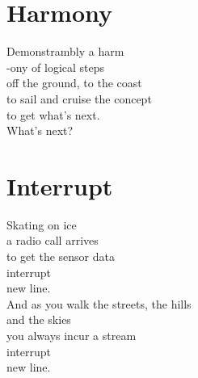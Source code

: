 \documentclass[a4paper,twoside, openany]{book}
\newenvironment{Verse}
  {\center\varwidth{\linewidth}\fontsize{18}{21.6}\selectfont}
  {\endvarwidth\endcenter}
\begin{document}
\chapter{Harmony}
\begin{Verse}
Demonstrambly a harm\\
-ony of logical steps\\
off the ground, to the coast\\
to sail and cruise the concept\\
to get what's next.\\
What's next?
\end{Verse}
\chapter{Interrupt}
\begin{Verse}
Skating on ice\\
a radio call arrives\\
to get the sensor data\\
interrupt\\
new line.\\
And as you walk the streets, the hills\\
and the skies\\
you always incur a stream\\
interrupt\\
new line.\\
\end{Verse}
\newpage\null\thispagestyle{empty}\newpage
\end{document}
